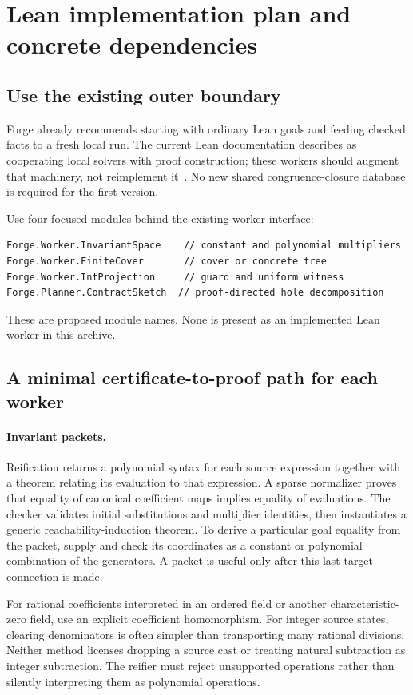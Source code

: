 \section{Lean implementation plan and concrete dependencies}
\label{sec:integration-new}

\subsection{Use the existing outer boundary}
Forge already recommends starting with ordinary Lean goals and feeding checked
facts to a fresh local  run. The current Lean documentation describes
 as cooperating local solvers with proof construction; these workers
should augment that machinery, not reimplement it~\cite{forge-integration,grind}.
No new shared congruence-closure database is required for the first version.

Use four focused modules behind the existing worker interface:
\begin{lstlisting}
Forge.Worker.InvariantSpace    // constant and polynomial multipliers
Forge.Worker.FiniteCover       // cover or concrete tree
Forge.Worker.IntProjection     // guard and uniform witness
Forge.Planner.ContractSketch  // proof-directed hole decomposition
\end{lstlisting}
These are proposed module names. None is present as an implemented Lean worker
in this archive.

\subsection{A minimal certificate-to-proof path for each worker}
\paragraph{Invariant packets.}
Reification returns a polynomial syntax for each source expression together with
a theorem relating its evaluation to that expression. A sparse normalizer proves
that equality of canonical coefficient maps implies equality of evaluations.
The checker validates initial substitutions and multiplier identities, then
instantiates a generic reachability-induction theorem. To derive a particular
goal equality from the packet, supply and check its coordinates as a constant
or polynomial combination of the generators. A packet is useful only after this
last target connection is made.

For rational coefficients interpreted in an ordered field or another
characteristic-zero field, use an explicit coefficient homomorphism. For integer
source states, clearing denominators is often simpler than transporting many
rational divisions. Neither method licenses dropping a source cast or treating
natural subtraction as integer subtraction. The reifier must reject unsupported
operations rather than silently interpreting them as polynomial operations.

